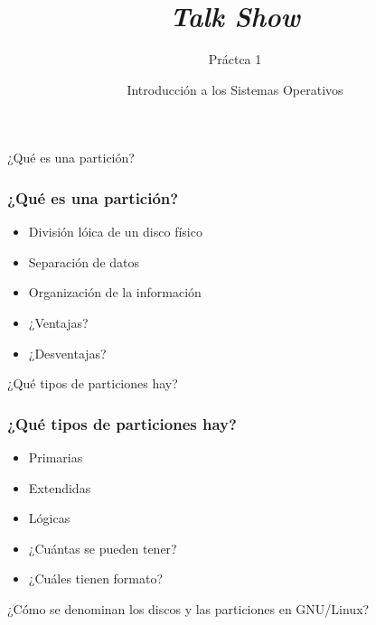 


\author{Introducción a los Sistemas Operativos}



\title{\textit{Talk Show}}
\subtitle{Práctca 1}
\begin{frame}
  \titlepage
\end{frame}

\begin{frame}
  \begin{center}
    \vfill
    \huge ¿Qué es una partición?
    \vfill
  \end{center}
\end{frame}

\begin{frame}
  \frametitle{¿Qué es una partición?}
  \begin{itemize}
	  \item División lóica de un disco físico
	  \item Separación de datos
	  \item Organización de la información
	  \item ¿Ventajas?
	  \item ¿Desventajas?
  \end{itemize}
\end{frame}

\begin{frame}
  \begin{center}
    \vfill
    \huge ¿Qué tipos de particiones hay?
    \vfill
  \end{center}
\end{frame}

\begin{frame}
  \frametitle{¿Qué tipos de particiones hay?}
  \begin{itemize}
	  \item Primarias
	  \item Extendidas
	  \item Lógicas
	  \item ¿Cuántas se pueden tener?
	  \item ¿Cuáles tienen formato?
  \end{itemize}
\end{frame}

\begin{frame}
  \begin{center}
    \vfill
    \huge ¿Cómo se denominan los discos y las particiones en GNU/Linux?
    \vfill
  \end{center}
\end{frame}

